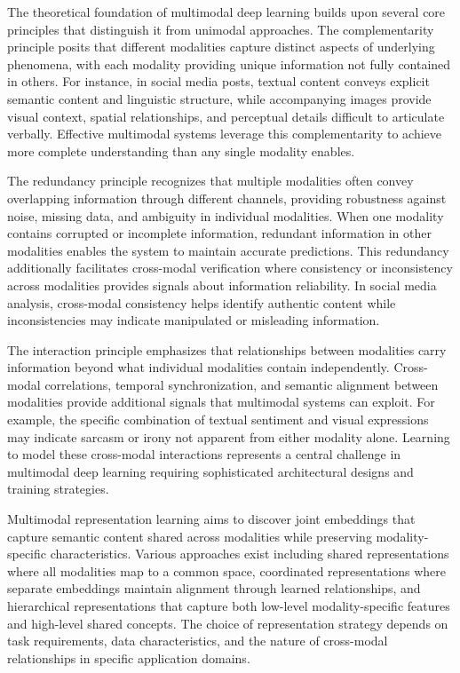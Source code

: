\documentclass[12pt,a4paper]{report}
\begin{document}
The theoretical foundation of multimodal deep learning builds upon several core principles that distinguish it from unimodal approaches. The complementarity principle posits that different modalities capture distinct aspects of underlying phenomena, with each modality providing unique information not fully contained in others. For instance, in social media posts, textual content conveys explicit semantic content and linguistic structure, while accompanying images provide visual context, spatial relationships, and perceptual details difficult to articulate verbally. Effective multimodal systems leverage this complementarity to achieve more complete understanding than any single modality enables.

The redundancy principle recognizes that multiple modalities often convey overlapping information through different channels, providing robustness against noise, missing data, and ambiguity in individual modalities. When one modality contains corrupted or incomplete information, redundant information in other modalities enables the system to maintain accurate predictions. This redundancy additionally facilitates cross-modal verification where consistency or inconsistency across modalities provides signals about information reliability. In social media analysis, cross-modal consistency helps identify authentic content while inconsistencies may indicate manipulated or misleading information.

The interaction principle emphasizes that relationships between modalities carry information beyond what individual modalities contain independently. Cross-modal correlations, temporal synchronization, and semantic alignment between modalities provide additional signals that multimodal systems can exploit. For example, the specific combination of textual sentiment and visual expressions may indicate sarcasm or irony not apparent from either modality alone. Learning to model these cross-modal interactions represents a central challenge in multimodal deep learning requiring sophisticated architectural designs and training strategies.

Multimodal representation learning aims to discover joint embeddings that capture semantic content shared across modalities while preserving modality-specific characteristics. Various approaches exist including shared representations where all modalities map to a common space, coordinated representations where separate embeddings maintain alignment through learned relationships, and hierarchical representations that capture both low-level modality-specific features and high-level shared concepts. The choice of representation strategy depends on task requirements, data characteristics, and the nature of cross-modal relationships in specific application domains.
\end{document}
